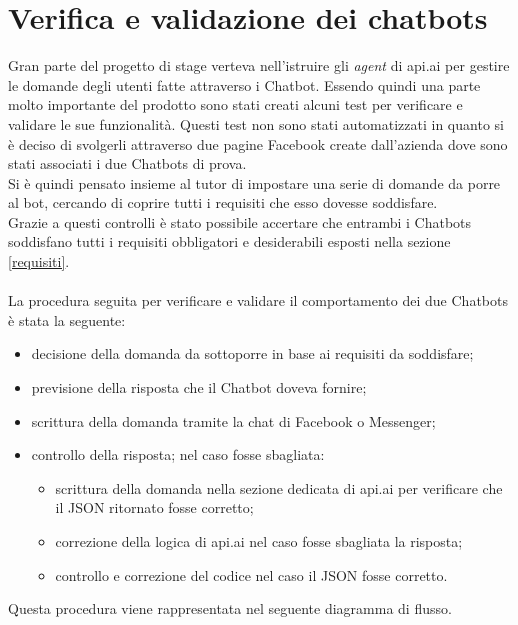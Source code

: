 \section{Verifica e validazione dei chatbots}
Gran parte del progetto di stage verteva nell'istruire gli \emph{agent} di api.ai per gestire le domande degli utenti fatte attraverso i \gls{Chatbot}. Essendo quindi una parte molto importante del prodotto sono stati creati alcuni test per verificare e validare le sue funzionalità. Questi test non sono stati automatizzati in quanto si è deciso di svolgerli attraverso due pagine Facebook create dall'azienda dove sono stati associati i due \glspl{Chatbot} di prova.\\
Si è quindi pensato insieme al tutor di impostare una serie di domande da porre al bot, cercando di coprire tutti i requisiti che esso dovesse soddisfare. \\
Grazie a questi controlli è stato possibile accertare che entrambi i \glspl{Chatbot} soddisfano tutti i requisiti obbligatori e desiderabili esposti nella sezione \ref{requisiti}.\\ \\
La procedura seguita per verificare e validare il comportamento dei due \glspl{Chatbot} è stata la seguente:
\begin{itemize}
	\item decisione della domanda da sottoporre in base ai requisiti da soddisfare;
	\item previsione della risposta che il \gls{Chatbot} doveva fornire;
	\item scrittura della domanda tramite la chat di Facebook o Messenger;
	\item controllo della risposta; nel caso fosse sbagliata:
	\begin{itemize}
		\item scrittura della domanda nella sezione dedicata di api.ai per verificare che il \gls{JSON} ritornato fosse corretto;
		\item correzione della logica di api.ai nel caso fosse sbagliata la risposta;
		\item controllo e correzione del codice nel caso il \gls{JSON} fosse corretto.
	\end{itemize}
\end{itemize}	 
Questa procedura viene rappresentata nel seguente diagramma di flusso.

